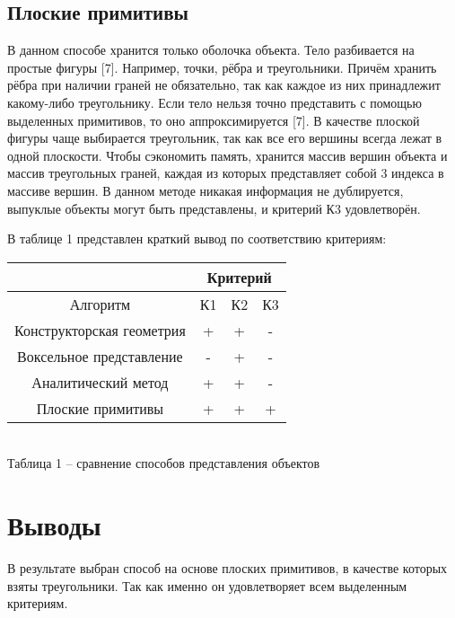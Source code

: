 {    \subsection{Плоские примитивы} {
        В данном способе хранится только оболочка объекта.
        Тело разбивается на простые фигуры [7].
        Например, точки, рёбра и треугольники.
        Причём хранить рёбра при наличии граней не обязательно, так как
        каждое из них принадлежит какому-либо треугольнику.
        Если тело нельзя точно представить с помощью выделенных примитивов,
        то оно аппроксимируется [7].
        В качестве плоской фигуры чаще выбирается треугольник, так как все его вершины всегда лежат в одной плоскости.
        Чтобы сэкономить память, хранится массив вершин объекта и массив треугольных граней, каждая из которых представляет собой 3 индекса в массиве вершин.
        В данном методе никакая информация не дублируется, выпуклые объекты могут
        быть представлены, и критерий К3 удовлетворён.
    }

    В таблице 1 представлен краткий вывод по соответствию критериям: \\
    \begin{center}
        \begin{tabular} { |c|c|c|c| }
            \hline
            \hspace{0pt} & \multicolumn{3}{|c|}{Критерий} \\
            \hline
            Алгоритм & К1 & К2 & К3 \\
            \hline
            Конструкторская геометрия & + & + & - \\
            \hline
            Воксельное представление & - & + & - \\
            \hline
            Аналитический метод & + & + & - \\
            \hline
            Плоские примитивы & + & + & + \\
            \hline
        \end{tabular} \\
        \vspace{2mm}
        \small { Таблица 1 -- сравнение способов представления объектов }
    \end{center}

    \section*{Выводы} {
        В результате выбран способ на основе плоских примитивов,
        в качестве которых взяты треугольники.
        Так как именно он удовлетворяет всем выделенным критериям.
    }
}